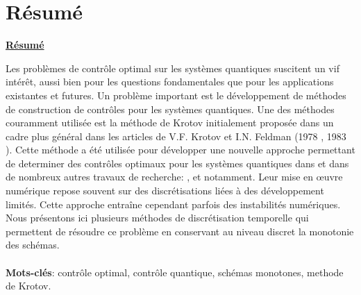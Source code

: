 \chapter*{Résumé}
\Large
\begin{flushleft}
\textbf{\underline{Résumé}}
\end{flushleft}
\normalsize
Les problèmes de contrôle optimal sur les systèmes quantiques suscitent un vif intérêt, aussi bien pour les questions fondamentales que pour les applications existantes et futures. Un problème important est le développement de méthodes de construction de contrôles pour les systèmes quantiques. Une des méthodes couramment utilisée est la méthode de Krotov initialement proposée dans un cadre plus général dans les articles de V.F. Krotov et I.N. Feldman (1978 \cite{Krotov1}, 1983 \cite{Krotov2}). Cette méthode a été utilisée pour développer une nouvelle approche permettant de determiner des contrôles optimaux pour les systèmes quantiques dans \cite{Tannor} et dans de nombreux autres travaux de recherche: \cite{Zhu}, \cite{Maday} et \cite{Salomon} notamment. Leur mise en œuvre numérique repose souvent sur des discrétisations liées à des développement limités. Cette approche entraîne cependant parfois des instabilités numériques. Nous présentons ici plusieurs méthodes de discrétisation temporelle qui permettent de résoudre ce problème en conservant au niveau discret la monotonie des schémas.\\\\
\textbf{Mots-clés}:  contrôle optimal, contrôle quantique, schémas monotones, methode de Krotov.